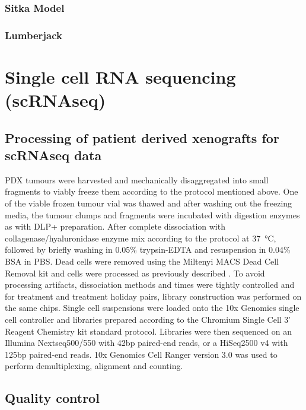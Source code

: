 \subsubsection{Sitka Model}

\subsubsection{Lumberjack}



\section{Single cell RNA sequencing (scRNAseq)}


\subsection{Processing of patient derived xenografts for scRNAseq data}
PDX tumours were harvested and mechanically disaggregated into small fragments to viably freeze them according to the protocol mentioned above. 
One of the viable frozen tumour vial was thawed and after washing out the freezing media, the tumour clumps and fragments were incubated with digestion enzymes as with DLP+ preparation. After complete dissociation with collagenase/hyaluronidase enzyme mix according to the protocol at \SI{37}{\degreeCelsius}, followed by briefly washing in 0.05\% trypsin-EDTA and resuspension in 0.04\% BSA in PBS. Dead cells were removed using the Miltenyi MACS Dead Cell Removal kit and cells were processed as previously described \cite{o2019dissociation}.
To avoid processing artifacts, dissociation methods and times were tightly controlled and for treatment and treatment holiday pairs, library construction was performed on the same chips. Single cell suspensions were loaded onto the 10x Genomics single cell controller and libraries prepared according to the Chromium Single Cell 3’ Reagent Chemistry kit standard protocol. 
Libraries were then sequenced on an Illumina Nextseq500/550 with 42bp paired-end reads, or a HiSeq2500 v4 with 125bp paired-end reads. 10x Genomics Cell Ranger version 3.0 was used to perform demultiplexing, alignment and counting.

\subsection{Quality control}

